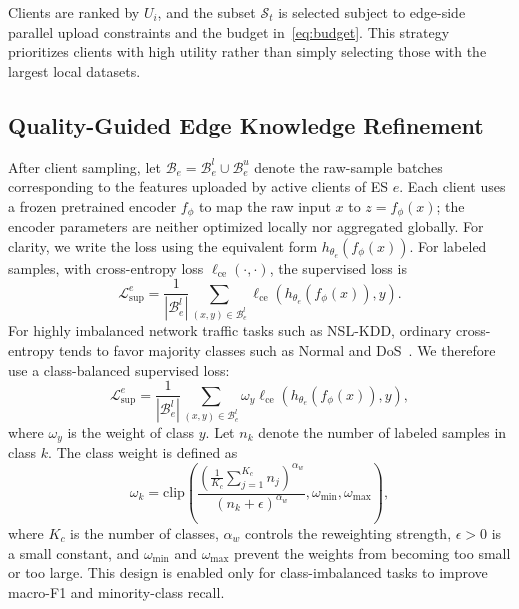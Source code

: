 ﻿\documentclass[10pt, conference, letterpaper]{ IEEEtran}
\begin{document}
Clients are ranked by $U_i$, and the subset $\mathcal{S}_t$ is selected subject to edge-side parallel upload constraints and the budget in~\eqref{eq:budget}. This strategy prioritizes clients with high utility rather than simply selecting those with the largest local datasets.

\subsection{Quality-Guided Edge Knowledge Refinement}
\label{subsec:edge_training}
After client sampling, let $\mathcal{B}_e=\mathcal{B}_e^l\cup\mathcal{B}_e^u$ denote the raw-sample batches corresponding to the features uploaded by active clients of ES $e$. Each client uses a frozen pretrained encoder $f_\phi$ to map the raw input $x$ to $z=f_\phi(x)$; the encoder parameters are neither optimized locally nor aggregated globally. For clarity, we write the loss using the equivalent form $h_{\theta_e}(f_\phi(x))$. For labeled samples, with cross-entropy loss $\ell_{\mathrm{ce}}(\cdot,\cdot)$, the supervised loss is
\begin{equation}
    \mathcal{L}_{\mathrm{sup}}^e =
    \frac{1}{|\mathcal{B}_e^l|}
    \sum_{(x,y)\in\mathcal{B}_e^l}
    \ell_{\mathrm{ce}}\left(h_{\theta_e}(f_\phi(x)), y\right).
    \label{eq:sup_loss}
\end{equation}
For highly imbalanced network traffic tasks such as NSL-KDD, ordinary cross-entropy tends to favor majority classes such as Normal and DoS~\cite{tavallaee2009detailed}. We therefore use a class-balanced supervised loss:
\begin{equation}
    \mathcal{L}_{\mathrm{sup}}^e =
    \frac{1}{|\mathcal{B}_e^l|}
    \sum_{(x,y)\in\mathcal{B}_e^l}
    \omega_y \ell_{\mathrm{ce}}\left(h_{\theta_e}(f_\phi(x)), y\right),
    \label{eq:weighted_sup_loss}
\end{equation}
where $\omega_y$ is the weight of class $y$. Let $n_k$ denote the number of labeled samples in class $k$. The class weight is defined as
\begin{equation}
    \omega_k =
    \mathrm{clip}\left(
    \frac{
    \left(\frac{1}{K_c}\sum_{j=1}^{K_c}n_j\right)^{\alpha_w}
    }{
    (n_k+\epsilon)^{\alpha_w}
    },
    \omega_{\min}, \omega_{\max}
    \right),
    \label{eq:class_weight}
\end{equation}
where $K_c$ is the number of classes, $\alpha_w$ controls the reweighting strength, $\epsilon>0$ is a small constant, and $\omega_{\min}$ and $\omega_{\max}$ prevent the weights from becoming too small or too large. This design is enabled only for class-imbalanced tasks to improve macro-F1 and minority-class recall.
\end{document}
